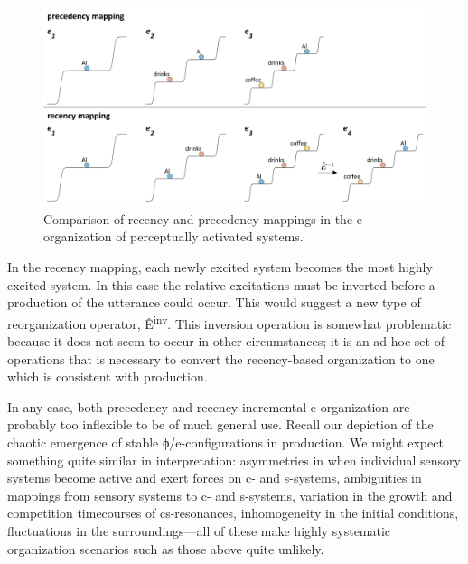   
\begin{figure}
\includegraphics[width=\textwidth]{figures/Tilsen-img128.png}
\caption{Comparison of recency and precedency mappings in the e-organization of perceptually activated systems.}
\label{fig:6:9}
\end{figure}
 

  In the recency mapping, each newly excited system becomes the most highly excited system. In this case the relative excitations must be inverted before a production of the utterance could occur. This would suggest a new type of reorganization operator, Ê\textsuperscript{{}inv}. This inversion operation is somewhat problematic because it does not seem to occur in other circumstances; it is an ad hoc set of operations that is necessary to convert the recency-based organization to one which is consistent with production.

  In any case, both precedency and recency incremental e-organization are probably too inflexible to be of much general use. Recall our depiction of the chaotic emergence of stable ϕ/e-configurations in production. We might expect something quite similar in interpretation: asymmetries in when individual sensory systems become active and exert forces on c- and s-systems, ambiguities in mappings from sensory systems to c- and s-systems, variation in the growth and competition timecourses of cs-resonances, inhomogeneity in the initial conditions, fluctuations in the surroundings—all of these make highly systematic organization scenarios such as those above quite unlikely.

